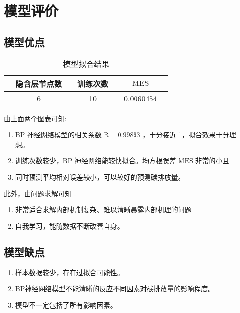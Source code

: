 \section{模型评价}

  \subsection{模型优点}


    \begin{table}[htb]
      \centering
      \caption{模型拟合结果}
      \begin{tabular*}{0.618\paperwidth}{@{\extracolsep{\fill}}ccccccc}
        \toprule[1.5pt]
        &隐含层节点数 && 训练次数 && $\mathrm{MES}$ &\\
        \midrule[1pt]
        &6 && 10 && 0.0060454 &\\
        \bottomrule[1.5pt]
      \end{tabular*}
      \label{tab:nihejieguo}
    \end{table}

    由上面两个图表可知\cite{zhangfaming2016}:
    \begin{enumerate}
      \item $\mathrm{BP}$ 神经网络模型的相关系数 $\mathrm{R}=0.99893$ ，十分接近 1，拟合效果十分理想。
      \item 训练次数较少，$\mathrm{BP}$ 神经网络能较快拟合。均方根误差 $\mathrm{MES}$ 非常的小且
      \item 同时预测平均相对误差较小，可以较好的预测碳排放量。
    \end{enumerate}
    
    此外，由问题求解可知：
    \begin{enumerate}
      \item 非常适合求解内部机制复杂、难以清晰暴露内部机理的问题
      \item 自我学习，能随数据不断改善自身。
    \end{enumerate}

  \subsection{模型缺点}
    \begin{enumerate}
      \item 样本数据较少，存在过拟合可能性。
      \item BP神经网络模型不能清晰的反应不同因素对碳排放量的影响程度。
      \item 模型不一定包括了所有影响因素。
    \end{enumerate}